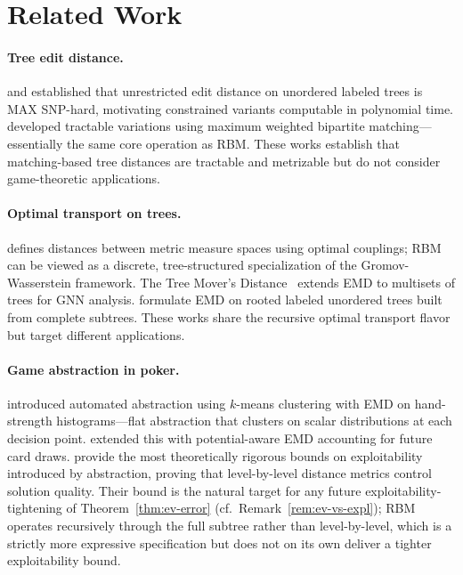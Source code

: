 \documentclass[11pt]{article}
\begin{document}
\section{Related Work}
\label{sec:related}

\paragraph{Tree edit distance.}
\citet{zhang1994simple} and \citet{zhang1996constrained} established
that unrestricted edit distance on unordered labeled trees is MAX
SNP-hard, motivating constrained variants computable in polynomial time.
\citet{kuboyama2007matching} developed tractable variations using maximum
weighted bipartite matching---essentially the same core operation as
RBM. These works establish that matching-based tree distances are
tractable and metrizable but do not consider game-theoretic
applications.

\paragraph{Optimal transport on trees.}
\citet{memoli2011gromov} defines distances between metric measure spaces
using optimal couplings; RBM can be viewed as a discrete,
tree-structured specialization of the Gromov-Wasserstein framework.
The Tree Mover's Distance~\citep{chuang2022tree} extends EMD to
multisets of trees for GNN analysis. \citet{yamada2018emd} formulate EMD
on rooted labeled unordered trees built from complete subtrees. These
works share the recursive optimal transport flavor but target different
applications.

\paragraph{Game abstraction in poker.}
\citet{gilpin2007potential} introduced automated abstraction using
$k$-means clustering with EMD on hand-strength histograms---flat
abstraction that clusters on scalar distributions at each decision
point. \citet{ganzfried2014potential} extended this with
potential-aware EMD accounting for future card draws.
\citet{kroer2014extensive,kroer2018unified} provide the most
theoretically rigorous bounds on exploitability introduced by
abstraction, proving that level-by-level distance metrics control
solution quality. Their bound is the natural target for any future
exploitability-tightening of Theorem~\ref{thm:ev-error} (cf.\
Remark~\ref{rem:ev-vs-expl}); RBM operates recursively through the
full subtree rather than level-by-level, which is a strictly more
expressive specification but does not on its own deliver a tighter
exploitability bound.
\end{document}
